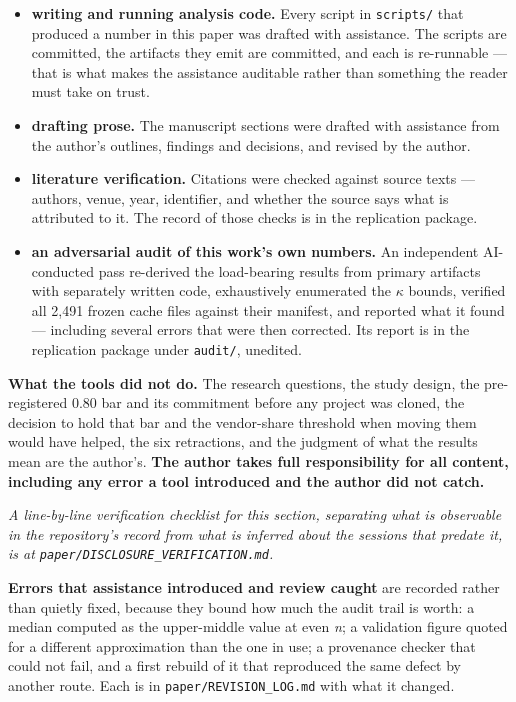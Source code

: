 \documentclass[11pt,a4paper]{article}
\begin{document}
\begin{itemize}
\item \textbf{writing and running analysis code.} Every script in \texttt{scripts/\allowbreak{}} that produced a number in this paper was drafted with assistance. The scripts are committed, the artifacts they emit are committed, and each is re-runnable --- that is what makes the assistance auditable rather than something the reader must take on trust.
\item \textbf{drafting prose.} The manuscript sections were drafted with assistance from the author's outlines, findings and decisions, and revised by the author.
\item \textbf{literature verification.} Citations were checked against source texts --- authors, venue, year, identifier, and whether the source says what is attributed to it. The record of those checks is in the replication package.
\item \textbf{an adversarial audit of this work's own numbers.} An independent AI-conducted pass re-derived the load-bearing results from primary artifacts with separately written code, exhaustively enumerated the $\kappa$ bounds, verified all 2,491 frozen cache files against their manifest, and reported what it found --- including several errors that were then corrected. Its report is in the replication package under \texttt{audit/\allowbreak{}}, unedited.
\end{itemize}

\textbf{What the tools did not do.} The research questions, the study design, the pre-registered 0.80 bar and its commitment before any project was cloned, the decision to hold that bar and the vendor-share threshold when moving them would have helped, the six retractions, and the judgment of what the results mean are the author's. \textbf{The author takes full responsibility for all content, including any error a tool introduced and the author did not catch.}

\emph{A line-by-line verification checklist for this section, separating what is observable in the repository's record from what is inferred about the sessions that predate it, is at \texttt{paper/\allowbreak{}DISCLOSURE\_\allowbreak{}VERIFICATION.\allowbreak{}md}.}

\textbf{Errors that assistance introduced and review caught} are recorded rather than quietly fixed, because they bound how much the audit trail is worth: a median computed as the upper-middle value at even \emph{n}; a validation figure quoted for a different approximation than the one in use; a provenance checker that could not fail, and a first rebuild of it that reproduced the same defect by another route. Each is in \texttt{paper/\allowbreak{}REVISION\_\allowbreak{}LOG.\allowbreak{}md} with what it changed.
\end{document}
